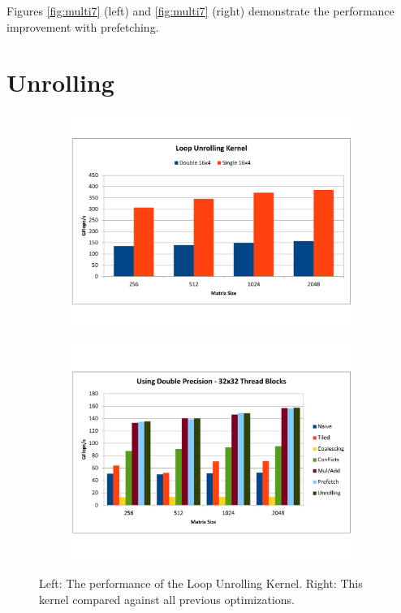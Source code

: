 \documentclass[paper=a4, fontsize=11pt]{scrartcl} %
\numberwithin{equation}{section} %
\numberwithin{figure}{section} %
\numberwithin{table}{section} %
\begin{document}
Figures \ref{fig:multi7} (left) and \ref{fig:multi7} (right) demonstrate the performance improvement with prefetching.\\

\section{\textbf{Unrolling}}
\begin{figure} [h]
\centering
\begin{subfigure}{.5\textwidth}
  \centering
  \includegraphics[width=\linewidth]{figures/unrolling.pdf}
  \label{fig:unroll}
\end{subfigure}%
\begin{subfigure}{.5\textwidth}
  \centering
  \includegraphics[width=\linewidth]{figures/unrolling_vs_prefetch.pdf}
  \label{fig:unroll_vs_prefetch}
\end{subfigure}
\caption{Left: The performance of the Loop Unrolling Kernel. Right: This kernel compared against all previous optimizations.}
\label{fig:multi8}
\end{figure}
\end{document}
